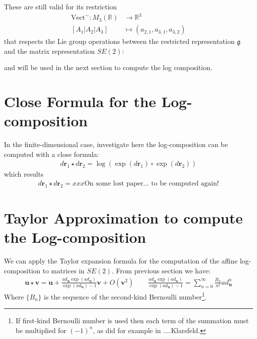 These are still valid for its restriction 
\begin{align*}
\text{Vect}^{\sim} : M_{3}(\mathbb{R}) & \longrightarrow \mathbb{R}^{3}\\
[A_1 \big| A_2  \big| A_3]
&\longmapsto  
(a_{2,1}, a_{3,1}, a_{3,2})
\end{align*}
that respects the Lie group operations between the restricted representation $\mathfrak{g}$ and the matrix representation $SE(2)$:


and will be used in the next section to compute the log composition.













\section{Close Formula for the Log-composition}
In the finite-dimensional case, investigate here the log-composition can be computed with a close formula:
\begin{align*}
d\mathbf{r}_{1}\star d\mathbf{r}_{2} =  \log(\exp(d\mathbf{r}_1)\circ \exp(d\mathbf{r}_2)) 
\end{align*}
which results
\begin{align*}
d\mathbf{r}_{1}\star d\mathbf{r}_{2} 
= 
xxx \text{On some lost paper... to be computed again!}
\end{align*}


\section{Taylor Approximation to compute the Log-composition}

We can apply the Taylor expansion formula for the computation of the affine log-composition to matrices in $SE(2)$.
From previous section we have:
\begin{align*}
\mathbf{u}\star \mathbf{v}  = \mathbf{u} + \frac{ ad_{\mathbf{u}} \exp(ad_{\mathbf{u}}) }{ \exp(ad_{\mathbf{u}}) - 1 }  \mathbf{v} + O({\mathbf{v}}^2)
\qquad
\frac{ ad_{\mathbf{u}} \exp(ad_{\mathbf{u}}) }{ \exp(ad_{\mathbf{u}}) - 1 }  = \sum_{n=0}^{\infty} \frac{B_{n}}{n!} ad_{\mathbf{u}}^{n} 
\end{align*}
Where $\lbrace B_{n} \rbrace $ is the sequence of the second-kind Bernoulli number\footnote{If first-kind Bernoulli number is used then each term of the summation must be multiplied for $(-1)^{n}$, as did for example in ....Klarsfeld.}.



